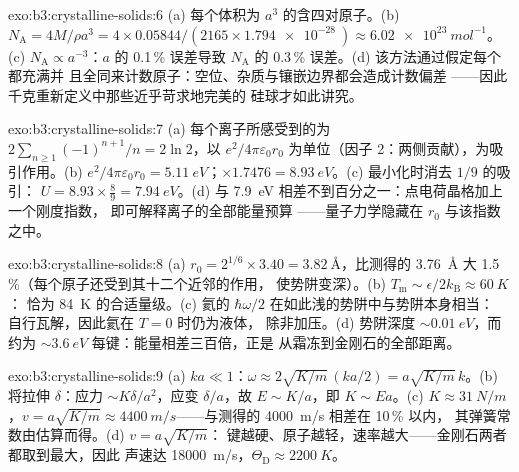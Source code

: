 \begin{solution}{exo:b3:crystalline-solids:6}
(a) 每个体积为 $a^3$ 的含四对原子。(b) $N_{\text{A}} =
4M/\rho a^3 = 4\times0.05844/(2165\times\qty{1.794e-28}{})
\approx \qty{6.02e23}{mol^{-1}}$。(c) $N_{\text{A}} \propto
a^{-3}$：$a$ 的 0.1\,\% 误差导致 $N_{\text{A}}$ 的 0.3\,\% 误差。(d)
该方法通过假定每个都充满并
且全同来计数原子：空位、杂质与镶嵌边界都会造成计数偏差
——因此千克重新定义中那些近乎苛求地完美的
硅球才如此讲究。
\end{solution}

\begin{solution}{exo:b3:crystalline-solids:7}
(a) 每个离子所感受到的为 $2\sum_{n\ge1}(-1)^{n+1}/n = 2\ln2$，以
$e^2/4\pi\varepsilon_0r_0$ 为单位（因子 2：两侧贡献），为吸引作用。(b)
$e^2/4\pi\varepsilon_0r_0 = \qty{5.11}{eV}$；$\times1.7476 =
\qty{8.93}{eV}$。(c) 最小化时消去 $1/9$ 的吸引：
$U = 8.93\times\tfrac89 = \qty{7.94}{eV}$。(d) 与
\qty{7.9}{eV} 相差不到百分之一：点电荷晶格加上一个刚度指数，
即可解释离子的全部能量预算
——量子力学隐藏在 $r_0$ 与该指数之中。
\end{solution}

\begin{solution}{exo:b3:crystalline-solids:8}
(a) $r_0 = 2^{1/6}\times3.40 = \qty{3.82}{\angstrom}$，比测得的
\qty{3.76}{\angstrom} 大 1.5\,\%（每个原子还受到其十二个近邻的作用，
使势阱变深）。(b)
$T_{\text{m}} \sim \epsilon/2k_{\text{B}} \approx \qty{60}{K}$：
恰为 \qty{84}{K} 的合适量级。(c) 氦的
$\hbar\omega/2$ 在如此浅的势阱中与势阱本身相当：
自行瓦解，因此氦在 $T = 0$ 时仍为液体，
除非加压。(d) 势阱深度 $\sim\qty{0.01}{eV}$，而约为
$\sim\qty{3.6}{eV}$ 每键：能量相差三百倍，正是
从霜冻到金刚石的全部距离。
\end{solution}

\begin{solution}{exo:b3:crystalline-solids:9}
(a) $ka \ll 1$：$\omega \approx 2\sqrt{K/m}\,(ka/2) =
a\sqrt{K/m}\,k$。(b) 将拉伸 $\delta$：应力 $\sim
K\delta/a^2$，应变 $\delta/a$，故 $E \sim K/a$，即 $K \sim
Ea$。(c) $K \approx \qty{31}{N/m}$，$v = a\sqrt{K/m} \approx
\qty{4400}{m/s}$——与测得的 \qty{4000}{m/s} 相差在 10\,\% 以内，
其弹簧常数由估算而得。(d) $v = a\sqrt{K/m}$：
键越硬、原子越轻，速率越大——金刚石两者都取到最大，因此
声速达 \qty{18000}{m/s}，$\Theta_{\text{D}} \approx
\qty{2200}{K}$。
\end{solution}

